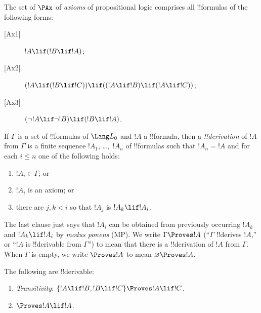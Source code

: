 \documentclass[../../../include/open-logic-section]{subfiles}
\begin{document}


\begin{defn}[Axioms]
The set of $\PAx$ of \emph{axioms} of propositional logic comprises
all !!{formula}s of the following forms:
\begin{description}
\item[{[Ax1]}] $!A \lif (!B \lif !A)$;
\item[{[Ax2]}] $(!A \lif (!B \lif !C)) \lif
    ((!A \lif !B) \lif (!A \lif !C))$;
\item[{[Ax3]}] $(\lnot !A \lif \lnot !B) \lif (!B
    \lif !A)$.
\end{description}
\end{defn}

\begin{defn}[!!^{derivability}]
If $\Gamma$ is a set of !!{formula}s of $\Lang L_0$ and $!A$ a
!!{formula}, then a \emph{!!{derivation}} of $!A$ from $\Gamma$ is a
finite sequence $!A_1$, \dots,~$!A_n$ of !!{formula}s such that $!A_n =
!A$ and for each $i \le n$ one of the following holds:
\begin{enumerate}
\item $!A_i \in \Gamma$; or
\item $!A_i$ is an axiom; or
\item there are $j,k<i$ so that $!A_j$ is $!A_k \lif
  !A_i$.
\end{enumerate}
\end{defn}

\begin{explain}
The last clause just says that $!A_i$ can be obtained from
previously occurring $!A_k$ and $!A_k \lif !A_i$ by
\emph{modus ponens} (MP).  We write $\Gamma \Proves !A$
(``$\Gamma$ !!{derive}s $!A$,'' or ``$!A$ is !!{derivable} from
$\Gamma$'') to mean that there is a !!{derivation} of $!A$ from
$\Gamma$. When $\Gamma$ is empty, we write $\Proves !A$ to mean
$\varnothing \Proves !A$.
\end{explain}

\begin{prop}
The following are !!{derivable}:
\begin{enumerate}
\item {}
\emph{Transitivity}: $\{!A \lif !B, !B \lif !C\} \Proves
  !A \lif !C$.
\item {}
  $\Proves !A \lif !A$. 
\end{enumerate}
\end{prop}
\end{document}
